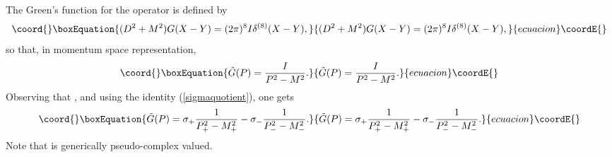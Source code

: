 \documentclass[a4paper,aps,prd,showkeys,showpacs,superscriptaddress,preprint]{revtex4}
\begin{document}
The Green's function \coordHE{} for the operator \coordHE{} is defined
by
\begin{equation}\coord{}\boxEquation{
  (D^2 + M^2) G(X-Y) = (2 \pi)^8 I \delta^{(8)}(X-Y),
}{
  (D^2 + M^2) G(X-Y) = (2 \pi)^8 I \delta^{(8)}(X-Y),
}{ecuacion}\coordE{}\end{equation}
so that, in momentum space representation, 
\begin{equation}\coord{}\boxEquation{\label{PKGprop}
  \tilde G(P) = \frac{I}{P^2 - M^2}.
}{\tilde G(P) = \frac{I}{P^2 - M^2}.
}{ecuacion}\coordE{}\end{equation}
Observing that \coordHE{}, and using the identity
(\ref{sigmaquotient}), one gets
\begin{equation}\coord{}\boxEquation{
  \tilde G(P) = \sigma_+ \frac{1}{P_+^2 - M_+^2} - \sigma_- \frac{1}{P_-^2 - M_-^2}.
}{
  \tilde G(P) = \sigma_+ \frac{1}{P_+^2 - M_+^2} - \sigma_- \frac{1}{P_-^2 - M_-^2}.
}{ecuacion}\coordE{}\end{equation}
Note that \coordHE{} is generically pseudo-complex valued. 
\end{document}
